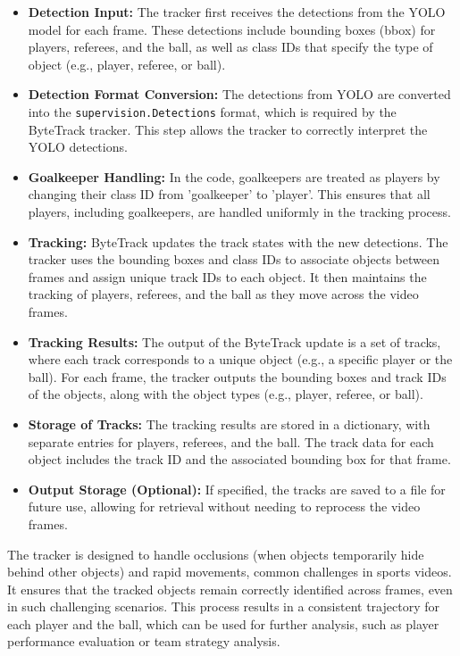 \begin{itemize}
    \item \textbf{Detection Input:} The tracker first receives the detections from the YOLO model for each frame. These detections include bounding boxes (bbox) for players, referees, and the ball, as well as class IDs that specify the type of object (e.g., player, referee, or ball).
    \item \textbf{Detection Format Conversion:} The detections from YOLO are converted into the \texttt{supervision.Detections} format, which is required by the ByteTrack tracker. This step allows the tracker to correctly interpret the YOLO detections.
    \item \textbf{Goalkeeper Handling:} In the code, goalkeepers are treated as players by changing their class ID from 'goalkeeper' to 'player'. This ensures that all players, including goalkeepers, are handled uniformly in the tracking process.
    \item \textbf{Tracking:} ByteTrack updates the track states with the new detections. The tracker uses the bounding boxes and class IDs to associate objects between frames and assign unique track IDs to each object. It then maintains the tracking of players, referees, and the ball as they move across the video frames.
    \item \textbf{Tracking Results:} The output of the ByteTrack update is a set of tracks, where each track corresponds to a unique object (e.g., a specific player or the ball). For each frame, the tracker outputs the bounding boxes and track IDs of the objects, along with the object types (e.g., player, referee, or ball).
    \item \textbf{Storage of Tracks:} The tracking results are stored in a dictionary, with separate entries for players, referees, and the ball. The track data for each object includes the track ID and the associated bounding box for that frame.
    \item \textbf{Output Storage (Optional):} If specified, the tracks are saved to a file for future use, allowing for retrieval without needing to reprocess the video frames.
\end{itemize}

The tracker is designed to handle occlusions (when objects temporarily hide behind other objects) and rapid movements, common challenges in sports videos. It ensures that the tracked objects remain correctly identified across frames, even in such challenging scenarios. This process results in a consistent trajectory for each player and the ball, which can be used for further analysis, such as player performance evaluation or team strategy analysis.

